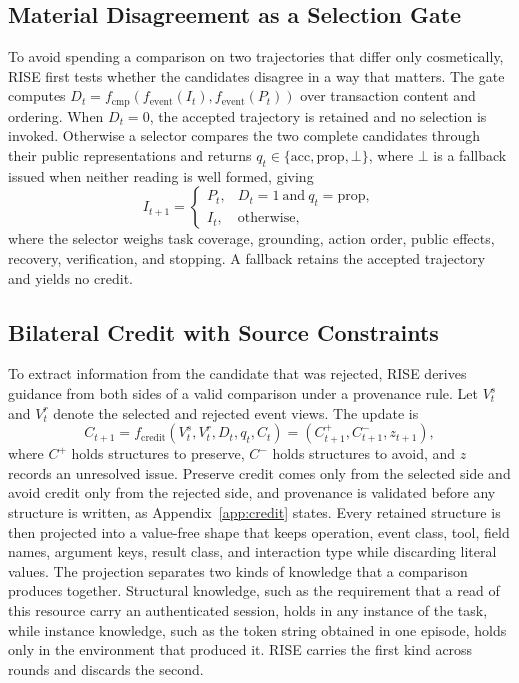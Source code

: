 \documentclass{article}
\newcommand{\method}{RISE\xspace}
\begin{document}
\subsection{Material Disagreement as a Selection Gate}
To avoid spending a comparison on two trajectories that differ only cosmetically, \method first tests whether the candidates disagree in a way that matters. The gate computes $D_t=f_{\mathrm{cmp}}(f_{\mathrm{event}}(I_t),f_{\mathrm{event}}(P_t))$ over transaction content and ordering. When $D_t=0$, the accepted trajectory is retained and no selection is invoked. Otherwise a selector compares the two complete candidates through their public representations and returns $q_t\in\{\mathrm{acc},\mathrm{prop},\bot\}$, where $\bot$ is a fallback issued when neither reading is well formed, giving
\begin{equation}
I_{t+1}=\begin{cases}P_t,&D_t=1\ \text{and}\ q_t=\mathrm{prop},\\[2pt]
I_t,&\text{otherwise},\end{cases}
\label{eq:accept}
\end{equation}
where the selector weighs task coverage, grounding, action order, public effects, recovery, verification, and stopping. A fallback retains the accepted trajectory and yields no credit.

\subsection{Bilateral Credit with Source Constraints}
To extract information from the candidate that was rejected, \method derives guidance from both sides of a valid comparison under a provenance rule. Let $V_t^s$ and $V_t^r$ denote the selected and rejected event views. The update is
\begin{equation}
C_{t+1}=f_{\mathrm{credit}}(V_t^s,V_t^r,D_t,q_t,C_t)=(C^{+}_{t+1},C^{-}_{t+1},z_{t+1}),
\label{eq:credit}
\end{equation}
where $C^{+}$ holds structures to preserve, $C^{-}$ holds structures to avoid, and $z$ records an unresolved issue. Preserve credit comes only from the selected side and avoid credit only from the rejected side, and provenance is validated before any structure is written, as Appendix~\ref{app:credit} states. Every retained structure is then projected into a value-free shape that keeps operation, event class, tool, field names, argument keys, result class, and interaction type while discarding literal values. The projection separates two kinds of knowledge that a comparison produces together. Structural knowledge, such as the requirement that a read of this resource carry an authenticated session, holds in any instance of the task, while instance knowledge, such as the token string obtained in one episode, holds only in the environment that produced it. \method carries the first kind across rounds and discards the second.
\end{document}
